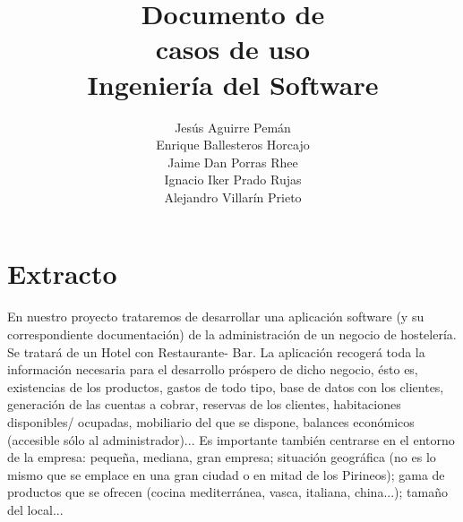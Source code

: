 \documentclass[spanish,a4paper,12pt]{report}	%
\begin{document}
\title{\textbf{\huge{Documento de \\ 
	casos de uso}} \\ \vspace{0.3cm}
	\Large{Ingeniería del Software}}
\author{ Jesús Aguirre Pemán \\
	 Enrique Ballesteros Horcajo \\
	 Jaime Dan Porras Rhee \\
	 Ignacio Iker Prado Rujas \\
	 Alejandro Villarín Prieto }
\date{\Today}
\maketitle

\newpage
\mbox{}
\thispagestyle{empty}						%
\newpage


\tableofcontents 							%

\newpage
\mbox{}
\thispagestyle{empty}						%
\newpage


\part{Extracto} %
En nuestro proyecto trataremos de desarrollar una aplicación software (y su correspondiente documentación) de la administración de un negocio de hostelería. Se tratará de un Hotel con Restaurante- Bar. La aplicación recogerá toda la información necesaria para el desarrollo próspero de dicho negocio, ésto es, existencias de los productos, gastos de todo tipo, base de datos con los clientes, generación de las cuentas a cobrar, reservas de los clientes, habitaciones disponibles/ ocupadas, mobiliario del que se dispone, balances económicos (accesible sólo al administrador)... Es importante también centrarse en el entorno de la empresa: pequeña, mediana, gran empresa; situación geográfica (no es lo mismo que se emplace en una gran ciudad o en mitad de los Pirineos); gama de productos que se ofrecen (cocina mediterránea, vasca, italiana, china...); tamaño del local... \\
\end{document}
